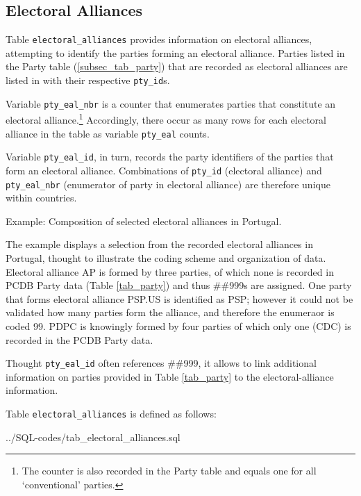 \subsection{Electoral Alliances}\label{subsec_tab_electoral_alliances}
Table \texttt{\footnotesize electoral\_alliances} provides information on electoral alliances, attempting to identify the parties forming an electoral alliance. 
Parties listed in the Party table (\ref{subsec_tab_party}) that are recorded as electoral alliances are listed in with their respective \texttt{\footnotesize pty\_id}s.

Variable \texttt{\footnotesize pty\_eal\_nbr} is a counter that enumerates parties that constitute an electoral alliance.\footnote{The counter is also recorded in the Party table and equals one for all `conventional' parties.}
Accordingly, there occur as many rows for each electoral alliance in the table as variable \texttt{\footnotesize pty\_eal} counts. 

Variable \texttt{\footnotesize pty\_eal\_id}, in turn, records the party identifiers of the parties that form an electoral alliance. Combinations of \texttt{\footnotesize pty\_id} (electoral alliance) and \texttt{\footnotesize pty\_eal\_nbr} (enumerator of party in electoral alliance) are therefore unique within countries.

\begin{table}[h!]
\centering\footnotesize
\caption*{Example: Composition of selected electoral alliances in Portugal.}

\end{table}

The example displays a selection from the recorded electoral alliances in Portugal, thought to illustrate the coding scheme and organization of data. 
Electoral alliance AP is formed by three parties, of which none is recorded in PCDB Party data (Table \ref{tab_party}) and thus \#\#999s are assigned. One party that forms electoral alliance PSP.US is identified as PSP; however it could not be validated how many parties form the alliance, and therefore the enumeraor is coded 99.
PDPC is knowingly formed by four parties of which only one (CDC) is recorded in the PCDB Party data.

Thought \texttt{\footnotesize pty\_eal\_id} often references \#\#999, it allows to link additional information on parties provided in Table \ref{tab_party} to the electoral-alliance information.

 Table \texttt{\footnotesize electoral\_alliances} is defined as follows:

%
{../SQL-codes/tab_electoral_alliances.sql}



